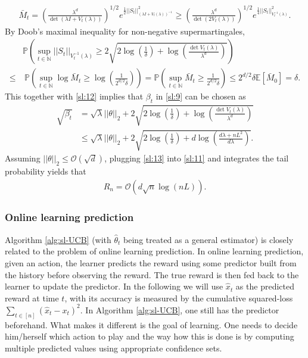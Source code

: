 \documentclass[10pt,a4article]{amsart}
\numberwithin{equation}{section}
\theoremstyle{plain}
\theoremstyle{definition}
\def\N{{\mathbb N}}
\def\E{{\mathbb E}}
\def\P{{\mathbb P}}
\def\t{{\theta}}
\begin{document}
\begin{align*}
\bar{M}_t = \left(\frac{\lambda^d}{\det (\lambda I+V_t(\lambda))}\right)^{1/2}e^{\frac{1}{2}||S_t||^2_{(\lambda I+V_t(\lambda))^{-1}}}\geq  \left(\frac{\lambda^d}{\det (2V_t(\lambda))}\right)^{1/2}e^{\frac{1}{4}||S_t||^2_{V^{-1}_t(\lambda)}}.
\end{align*}
By Doob's maximal inequality for non-negative supermartingales, 
\begin{align*}
&\P\left(\sup_{t\in\N}||S_t||_{V^{-1}_t(\lambda)}\geq 2\sqrt{2\log\left(\frac{1}{\delta}\right)+\log\left(\frac{\det V_t(\lambda)}{\lambda^d}\right)}\right)\\
\leq&\ \P\left(\sup_{t\in\N}\log\bar{M}_t\geq\log\left(\frac{1}{2^{d/2}\delta}\right)\right) = \P\left(\sup_{t\in\N}\bar{M}_t\geq \frac{1}{2^{d/2}\delta}\right)\leq 2^{d/2}\delta\E[\bar{M}_0]=\delta. 
\end{align*}
This together with \eqref{sl:12} implies that $\beta_t$ in \eqref{sl:9} can be chosen as 
\begin{align}
\sqrt{\beta_t} &= \sqrt{\lambda}||\t||_2+2\sqrt{2\log\left(\frac{1}{\delta}\right)+\log\left(\frac{\det V_t(\lambda)}{\lambda^d}\right)}\nonumber\\
&\leq\sqrt{\lambda}||\t||_2+2\sqrt{2\log\left(\frac{1}{\delta}\right)+d\log\left(\frac{d\lambda+nL^2}{d\lambda}\right)}\label{sl:13}.
\end{align}
Assuming $||\t||_2\leq\mathcal O(\sqrt{d})$, plugging \eqref{sl:13} into \eqref{sl:11} and integrates the tail probability yields that 
\begin{align*}
R_n = \mathcal O \left(d\sqrt{n}\log (nL)\right).
\end{align*}

\subsubsection{Online learning prediction}\label{sec:olp}

Algorithm \ref{alg:sl-UCB} (with $\hat{\t}_t$ being treated as a general estimator) is closely related to the problem of online learning prediction. 
In online learning prediction, given an action, the learner predicts the reward using some predictor built from the history before observing the reward. 
The true reward is then fed back to the learner to update the predictor. 
In the following we will use $\hat{x}_t$ as the predicted reward at time $t$, with its accuracy is measured by the cumulative squared-loss $\sum_{t\in [n]}(\hat{x}_t-x_t)^2$. 
In Algorithm \ref{alg:sl-UCB}, one still has the predictor beforehand. What makes it different is the goal of learning. One needs to decide him/herself which action to play and the way how this is done is by computing multiple predicted values using appropriate confidence sets. 
\end{document}
